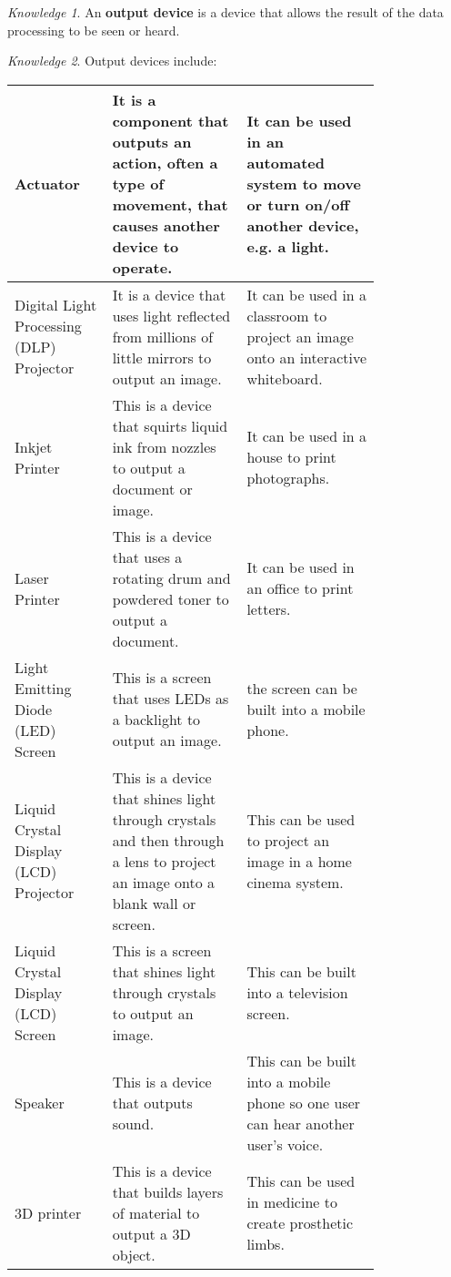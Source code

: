 \documentclass[8pt]{article}
\theoremstyle{remark}
\newtheorem{knowledge}{Knowledge}[subsection]
\begin{document}
            \begin{knowledge}
                An \textbf{output device} is a device that allows the result of the data processing to be seen or heard.
            \end{knowledge}

            \begin{knowledge}
                Output devices include:
                \begin{center}
                    \begin{tabular}{p{0.2\linewidth}|p{0.3\linewidth}|p{0.3\linewidth}}
                        Actuator & It is a component that outputs an action, often a type of movement, that causes another device to operate. & It can be used in an automated system to move or turn on/off another device, e.g. a light.\\\hline
                        Digital Light Processing (DLP) Projector & It is a device that uses light reflected from millions of little mirrors to output an image. & It can be used in a classroom to project an image onto an interactive whiteboard.\\\hline
                        Inkjet Printer & This is a device that squirts liquid ink from nozzles to output a document or image. & It can be used in a house to print photographs.\\\hline
                        Laser Printer & This is a device that uses a rotating drum and powdered toner to output a document. & It can be used in an office to print letters.\\\hline
                        Light Emitting Diode (LED) Screen & This is a screen that uses LEDs as a backlight to output an image. & the screen can be built into a mobile phone.\\\hline
                        Liquid Crystal Display (LCD) Projector & This is a device that shines light through crystals and then through a lens to project an image onto a blank wall or screen. & This can be used to project an image in a home cinema system.\\\hline
                        Liquid Crystal Display (LCD) Screen & This is a screen that shines light through crystals to output an image. & This can be built into a television screen.\\\hline
                        Speaker & This is a device that outputs sound. & This can be built into a mobile phone so one user can hear another user's voice.\\\hline
                        3D printer & This is a device that builds layers of material to output a 3D object. & This can be used in medicine to create prosthetic limbs.
                    \end{tabular}
                \end{center}
            \end{knowledge}
\end{document}
